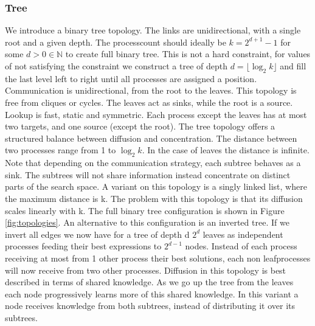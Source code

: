 \subsubsection{Tree}
We introduce a binary tree topology. The links are unidirectional, with a single root and a given depth. The processcount should ideally be $k = 2^{d+1} -1$ for some $d > 0 \in \mathbb{N}$ to create full binary tree. This is not a hard constraint, for values of not satisfying the constraint we construct a tree of depth $ d =\lfloor\log_2{k}\rfloor$ and fill the last level left to right until all processes are assigned a position. Communication is unidirectional, from the root to the leaves. This topology is free from cliques or cycles. The leaves act as sinks, while the root is a source. Lookup is fast, static and symmetric. Each process except the leaves has at most two targets, and one source (except the root). The tree topology offers a structured balance between diffusion and concentration. The distance between two processes range from 1 to $\log_2{k}$. In the case of leaves the distance is infinite. Note that depending on the communication strategy, each subtree behaves as a sink. The subtrees will not share information instead concentrate on distinct parts of the search space.
A variant on this topology is a singly linked list, where the maximum distance is k. The problem with this topology is that its diffusion scales linearly with k. The full binary tree configuration is shown in Figure \ref{fig:topologies}.
An alternative to this configuration is an inverted tree. If we invert all edges we now have for a tree of depth d $2^d$ leaves as independent processes feeding their best expressions to $2^{d-1}$ nodes. Instead of each process receiving at most from 1 other process their best solutions, each non leafprocesses will now receive from two other processes. Diffusion in this topology is best described in terms of shared knowledge. As we go up the tree from the leaves each node progressively learns more of this shared knowledge. In this variant a node receives knowledge from both subtrees, instead of distributing it over its subtrees.

